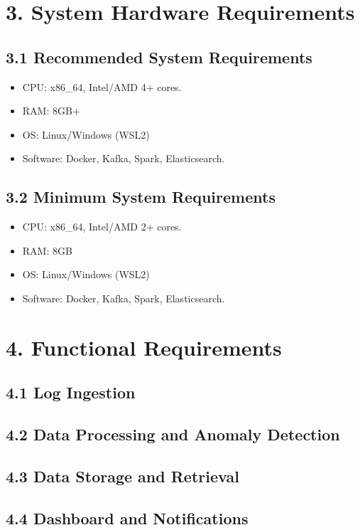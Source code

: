\documentclass[a4paper,12pt]{report}
\begin{document}
\section{3. System Hardware Requirements}
\subsection{3.1 Recommended System Requirements}
\begin{itemize}
    \item CPU: x86\_64, Intel/AMD 4+ cores.
    \item RAM: 8GB+
    \item OS: Linux/Windows (WSL2)
    \item Software: Docker, Kafka, Spark, Elasticsearch.
\end{itemize}

\subsection{3.2 Minimum System Requirements}
\begin{itemize}
    \item CPU: x86\_64, Intel/AMD 2+ cores.
    \item RAM: 8GB
    \item OS: Linux/Windows (WSL2)
    \item Software: Docker, Kafka, Spark, Elasticsearch.
\end{itemize}

\section{4. Functional Requirements}
\subsection{4.1 Log Ingestion}
\subsection{4.2 Data Processing and Anomaly Detection}
\subsection{4.3 Data Storage and Retrieval}
\subsection{4.4 Dashboard and Notifications}
\end{document}

